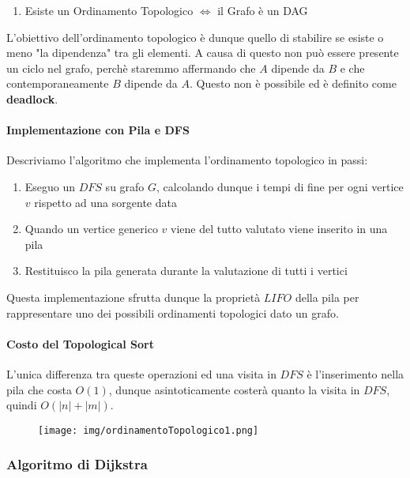 \documentclass{article}
\begin{document}
\begin{enumerate}
    \item Esiste un Ordinamento Topologico $\Leftrightarrow$ il Grafo è un DAG
\end{enumerate}

L'obiettivo dell'ordinamento topologico è dunque quello di stabilire se esiste o meno "la dipendenza" tra gli elementi. A causa di questo non può essere presente un ciclo nel grafo, perchè staremmo affermando che $A$ dipende da $B$ e che contemporaneamente $B$ dipende da $A$. Questo non è possibile ed è definito come \textbf{deadlock}.

\paragraph{Implementazione con Pila e DFS}

Descriviamo l'algoritmo che implementa l'ordinamento topologico in passi:

\begin{enumerate}
    \item Eseguo un $DFS$ su grafo $G$, calcolando dunque i tempi di fine per ogni vertice $v$ rispetto ad una sorgente data
    \item Quando un vertice generico $v$ viene del tutto valutato viene inserito in una pila
    \item Restituisco la pila generata durante la valutazione di tutti i vertici
\end{enumerate}

Questa implementazione sfrutta dunque la proprietà $LIFO$ della pila per rappresentare uno dei possibili ordinamenti topologici dato un grafo.

\paragraph{Costo del Topological Sort} L'unica differenza tra queste operazioni ed una visita in $DFS$ è l'inserimento nella pila che costa $O(1)$, dunque asintoticamente costerà quanto la visita in $DFS$, quindi $O(|n|+|m|)$.

\begin{figure}[htbp]
        \center
        \texttt{[image: img/ordinamentoTopologico1.png]}
    \end{figure}

\newpage

\subsubsection{Algoritmo di Dijkstra}
\end{document}
